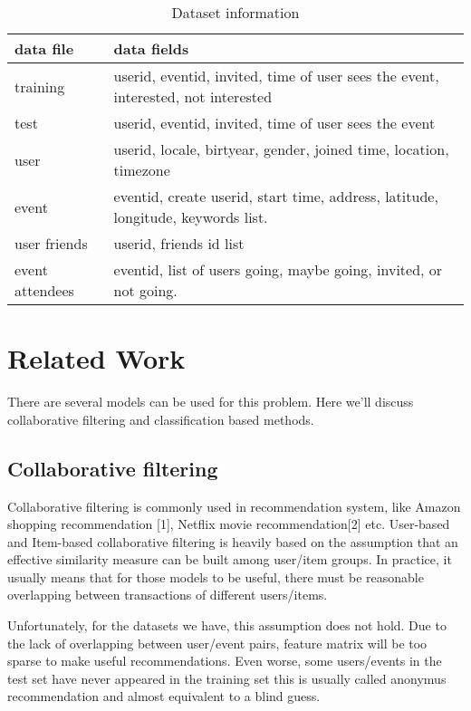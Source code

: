 \documentclass{article} %
\begin{document}
\begin{table}[H]
\caption{Dataset information}
\label{sample-table}
\begin{center}
\begin{tabular}{|l|l|}
\hline 
\textbf{data file} & \textbf{data fields} \\ \hline
training  & userid, eventid, invited, time of user sees the event, interested, not interested \\ \hline
test      & userid, eventid, invited, time of user sees the event \\ \hline
user      & userid, locale, birtyear, gender, joined time, location, timezone \\ \hline
event     & eventid, create userid, start time, address, latitude, longitude, keywords list. \\ \hline
user friends & userid, friends id list  \\ \hline
event attendees & eventid, list of users going, maybe going, invited, or not going. \\ \hline
\end{tabular}
\end{center}
\end{table}

\section{Related Work}


There are several models can be used for this problem. Here we'll discuss collaborative filtering and classification based methods.

\subsection{Collaborative filtering}

Collaborative filtering is commonly used in recommendation system, like Amazon shopping recommendation [1], Netflix movie recommendation[2] etc. User-based and Item-based collaborative filtering is heavily based on the assumption that an effective similarity measure can be built among user/item groups. In practice, it usually means that for those models to be useful, there must be reasonable overlapping between transactions of different users/items. 

Unfortunately, for the datasets we have, this assumption does not hold. Due to the lack of overlapping between user/event pairs, feature matrix will be too sparse to make useful recommendations. Even worse, some users/events in the test set have never appeared in the training set this is usually called anonymus recommendation and almost equivalent to a blind guess.
\end{document}
